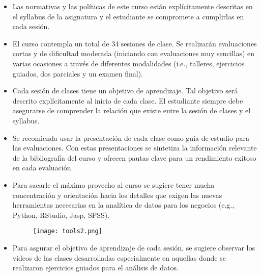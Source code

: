 \documentclass[aspectratio=169]{beamer}
\begin{document}
\begin{frame}
\begin{itemize}
\item Las normativas y las políticas de este curso están explícitamente descritas en el syllabus de la asignatura y el estudiante se compromete a cumplirlas en cada sesión.
\vspace{0.5cm}
\item El curso contempla un total de 34 sesiones de clase. Se realizarán evaluaciones cortas y de dificultad moderada (iniciando con evaluaciones muy sencillas) en varias ocasiones a través de diferentes modalidades (i.e., talleres, ejercicios guiados, dos parciales y un examen final).
\end{itemize}    
\end{frame}

\begin{frame}
\begin{itemize}
\item Cada sesión de clases tiene un objetivo de aprendizaje. Tal objetivo será descrito explícitamente al inicio de cada clase. El estudiante siempre debe asegurarse de comprender la relación que existe entre la sesión de clases y el syllabus.
\vspace{0.5cm}
\item Se recomienda usar la presentación de cada clase como guía de estudio para las evaluaciones. Con estas presentaciones se sintetiza la información relevante de la bibliografía del curso y ofrecen pautas clave para un rendimiento  exitoso en cada evaluación.
\end{itemize}
\end{frame}

\begin{frame}
\begin{itemize}
\item Para sacarle el máximo provecho al curso se sugiere tener mucha concentración y orientación hacia los detalles que exigen las nuevas herramientas necesarias en la analítica de datos para los negocios (e.g., Python, RStudio, Jasp, SPSS).
\begin{figure}
\centering
 \texttt{[image: tools2.png]}
\end{figure}
\end{itemize}
\end{frame}

\begin{frame}
\begin{itemize}
\item Para asgurar el objetivo de aprendizaje de cada sesión, se sugiere observar los videos de las clases desarrolladas especialmente en aquellas donde se realizaron ejercicios guiados para el análisis de datos.
\end{itemize}
\end{frame}
\end{document}
